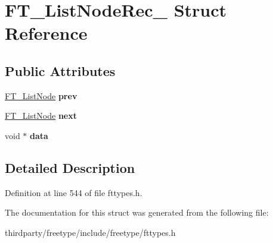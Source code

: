 \hypertarget{struct_f_t___list_node_rec__}{}\section{F\+T\+\_\+\+List\+Node\+Rec\+\_\+ Struct Reference}
\label{struct_f_t___list_node_rec__}
\subsection*{Public Attributes}
\begin{DoxyCompactItemize}
\item 
\mbox{\label{struct_f_t___list_node_rec___a41c77950e6940b1b98e04709b705c046}} 
\hyperlink{struct_f_t___list_node_rec__}{F\+T\+\_\+\+List\+Node} {\bfseries prev}
\item 
\mbox{\label{struct_f_t___list_node_rec___a8275962fa8c92b77435cb4fa76251f39}} 
\hyperlink{struct_f_t___list_node_rec__}{F\+T\+\_\+\+List\+Node} {\bfseries next}
\item 
\mbox{\label{struct_f_t___list_node_rec___ab0202be88f722442a4bec9aeb5f6418f}} 
void $\ast$ {\bfseries data}
\end{DoxyCompactItemize}


\subsection{Detailed Description}


Definition at line 544 of file fttypes.\+h.



The documentation for this struct was generated from the following file\+:\begin{DoxyCompactItemize}
\item 
thirdparty/freetype/include/freetype/fttypes.\+h\end{DoxyCompactItemize}
